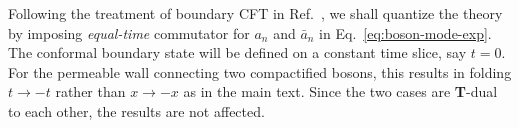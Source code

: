 Following the treatment of boundary CFT in Ref.~, we shall quantize the theory by imposing \emph{equal-time} commutator for $a_n$ and $\bar{a}_n$ in Eq.~\eqref{eq:boson-mode-exp}. The conformal boundary state will be defined on a constant time slice, say $t=0$. For the permeable wall connecting two compactified bosons, this results in folding $t\rightarrow-t$ rather than $x\rightarrow-x$ as in the main text. Since the two cases are {\bf T}-dual to each other, the results are not affected.


